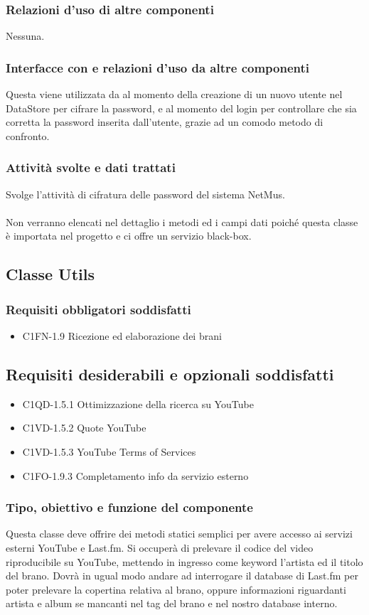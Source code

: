 \subsubsection*{Relazioni d'uso di altre componenti}
Nessuna.
\subsubsection*{Interfacce con e relazioni d'uso da altre componenti}
Questa viene utilizzata da  al momento della creazione di
un nuovo utente nel DataStore per cifrare la password, e al momento del login
per controllare che sia corretta la password inserita dall'utente, grazie ad un
comodo metodo di confronto.
 \subsubsection*{Attivit\`a svolte e dati trattati}
Svolge l'attivit\`a di cifratura delle password del sistema NetMus.
\\\\
Non verranno elencati nel dettaglio i metodi ed i campi dati poich\'e questa
classe \`e importata nel progetto e ci offre un servizio black-box.

\subsection{Classe Utils}
\subsubsection*{Requisiti obbligatori soddisfatti}
\begin{itemize}
    \item C1FN-1.9 Ricezione ed elaborazione dei brani
\end{itemize}
\subsection*{Requisiti desiderabili e opzionali soddisfatti}
\begin{itemize}
    \item C1QD-1.5.1 Ottimizzazione della ricerca su YouTube
    \item C1VD-1.5.2 Quote YouTube
    \item C1VD-1.5.3 YouTube Terms of Services
    \item C1FO-1.9.3 Completamento info da servizio esterno
\end{itemize}
\subsubsection*{Tipo, obiettivo e funzione del componente}
Questa classe deve offrire dei metodi statici semplici per avere accesso ai
servizi esterni YouTube e Last.fm. Si occuper\`a di prelevare il codice
del video riproducibile su YouTube, mettendo in ingresso come keyword l'artista
ed il titolo del brano. Dovr\`a in ugual modo andare ad interrogare il database
di Last.fm per poter prelevare la copertina relativa al brano, oppure
informazioni riguardanti artista e album se mancanti nel tag del brano e nel
nostro database interno.
